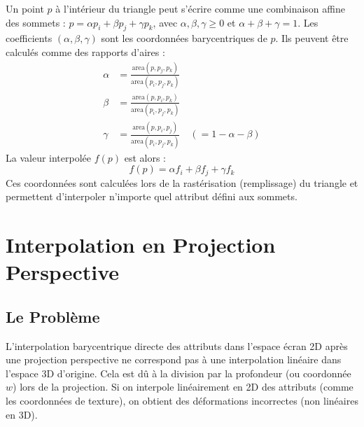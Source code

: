 \documentclass{article}
\begin{document}
Un point $p$ à l'intérieur du triangle peut s'écrire comme une combinaison affine des sommets :
$p = \alpha p_i + \beta p_j + \gamma p_k$, avec $\alpha, \beta, \gamma \ge 0$ et $\alpha + \beta + \gamma = 1$.
Les coefficients $(\alpha, \beta, \gamma)$ sont les coordonnées barycentriques de $p$. Ils peuvent être calculés comme des rapports d'aires :
\begin{align*} \alpha &= \frac{\text{area}(p, p_j, p_k)}{\text{area}(p_i, p_j, p_k)} \\ \beta &= \frac{\text{area}(p, p_i, p_k)}{\text{area}(p_i, p_j, p_k)} \\ \gamma &= \frac{\text{area}(p, p_i, p_j)}{\text{area}(p_i, p_j, p_k)} \quad (= 1 - \alpha - \beta) \end{align*}
La valeur interpolée $f(p)$ est alors :
\[ f(p) = \alpha f_i + \beta f_j + \gamma f_k \]
Ces coordonnées sont calculées lors de la rastérisation (remplissage) du triangle et permettent d'interpoler n'importe quel attribut défini aux sommets.

\section{Interpolation en Projection Perspective}

\subsection{Le Problème}
L'interpolation barycentrique directe des attributs dans l'espace écran 2D après une projection perspective ne correspond pas à une interpolation linéaire dans l'espace 3D d'origine. Cela est dû à la division par la profondeur (ou coordonnée $w$) lors de la projection. Si on interpole linéairement en 2D des attributs (comme les coordonnées de texture), on obtient des déformations incorrectes (non linéaires en 3D).
\end{document}
